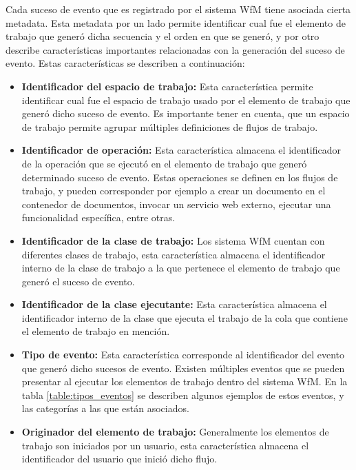 Cada suceso de evento que es registrado por el sistema WfM tiene asociada cierta metadata. Esta metadata por un lado permite identificar cual fue el elemento de trabajo que generó dicha secuencia y el orden en que se generó, y por otro describe características importantes relacionadas con la generación del suceso de evento. Estas características se describen a continuación:

\begin{itemize}
    \item \textbf{Identificador del espacio de trabajo:} Esta característica permite identificar cual fue el espacio de trabajo usado por el elemento de trabajo que generó dicho suceso de evento. Es importante tener en cuenta, que un espacio de trabajo permite agrupar múltiples definiciones de flujos de trabajo.
    
    \item \textbf{Identificador de operación:} Esta característica almacena el identificador de la operación que se ejecutó en el elemento de trabajo que generó determinado suceso de evento. Estas operaciones se definen en los flujos de trabajo, y pueden corresponder por ejemplo a crear un documento en el contenedor de documentos, invocar un servicio web externo, ejecutar una funcionalidad específica, entre otras.
    
    \item \textbf{Identificador de la clase de trabajo:} Los sistema WfM cuentan con diferentes clases de trabajo, esta característica almacena el identificador interno de la clase de trabajo a la que pertenece el elemento de trabajo que generó el suceso de evento.
    
    \item \textbf{Identificador de la clase ejecutante:} Esta característica almacena el identificador interno de la clase que ejecuta el trabajo de la cola que contiene el elemento de trabajo en mención.
    
    \item \textbf{Tipo de evento:} Esta característica corresponde al identificador del evento que generó dicho sucesos de evento. Existen múltiples eventos que se pueden presentar al ejecutar los elementos de trabajo dentro del sistema WfM. En la tabla \ref{table:tipos_eventos} se describen algunos ejemplos de estos eventos, y las categorías a las que están asociados. 
    
    \item \textbf{Originador del elemento de trabajo:} Generalmente los elementos de trabajo son iniciados por un usuario, esta característica almacena el identificador del usuario que inició dicho flujo.
    

\end{itemize}
